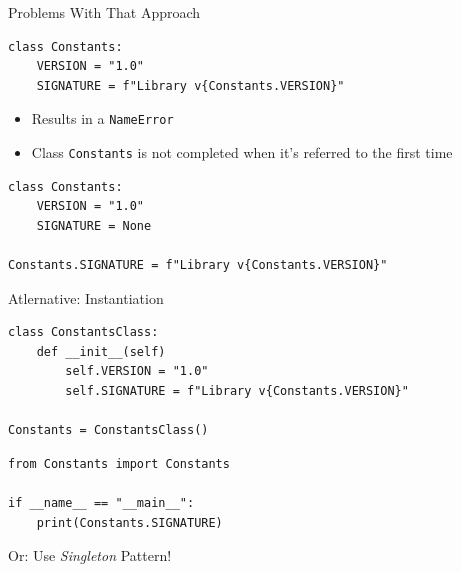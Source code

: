 \begin{frame}[fragile]{Problems With That Approach}
%
\vspace{-9pt}
\begin{warnbox}[Cross-Referencing Constants, leftupper=7mm]
\begin{verbatim}
class Constants:
    VERSION = "1.0"
    SIGNATURE = f"Library v{Constants.VERSION}"
\end{verbatim}
\end{warnbox}
%
\begin{itemize}
\item Results in a \texttt{NameError}
\item Class \texttt{Constants} is not completed when it's referred to the first time
\end{itemize}
%
\begin{codebox}
\begin{verbatim}
class Constants:
    VERSION = "1.0"
    SIGNATURE = None

Constants.SIGNATURE = f"Library v{Constants.VERSION}"
\end{verbatim}
\end{codebox}
%
\end{frame}


\begin{frame}[fragile]{Atlernative: Instantiation}
%
\vspace{-9pt}
\begin{codebox}[Constants.py]
\begin{verbatim}
class ConstantsClass:
    def __init__(self)
        self.VERSION = "1.0"
        self.SIGNATURE = f"Library v{Constants.VERSION}"

Constants = ConstantsClass()
\end{verbatim}
\end{codebox}
%
\begin{codebox}[main.py]
\begin{verbatim}
from Constants import Constants

if __name__ == "__main__":
    print(Constants.SIGNATURE)
\end{verbatim}
\end{codebox}
%
Or: Use \emph{Singleton} Pattern!
%
\end{frame}

